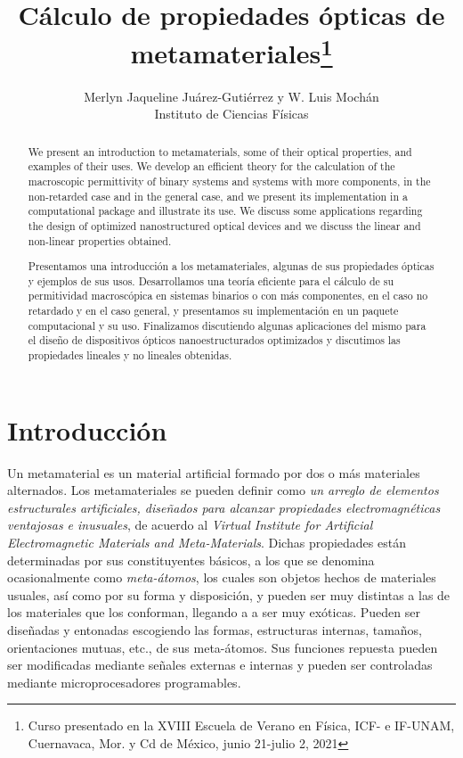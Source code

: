 \documentclass[12pt]{article}
\title{Cálculo de propiedades ópticas de metamateriales\footnote{Curso
    presentado en la XVIII Escuela de Verano en Física, ICF- e
    IF-UNAM, Cuernavaca, Mor. y Cd de México,
  junio 21-julio 2, 2021}}
\author{ Merlyn Jaqueline Juárez-Gutiérrez y W. Luis Mochán\\
  Instituto de Ciencias Físicas}
\begin{document}
\maketitle
{}
\begin{abstract}
  We present an introduction to metamaterials, some of their optical
  properties, and examples of their uses. We develop an efficient
  theory for the calculation of the macroscopic permittivity of binary
  systems and systems with more components, in the non-retarded case and in the
  general case, and we present its implementation in a computational
  package and illustrate its use. We discuss some applications regarding
  the design of optimized nanostructured optical devices and we
  discuss the linear and non-linear properties obtained.
\end{abstract}

\begin{abstract}
  Presentamos una introducción a los metamateriales, algunas de sus
  propiedades ópticas y ejemplos de sus usos. Desarrollamos una teoría
  eficiente para el cálculo de su permitividad macroscópica en
  sistemas binarios o con más componentes, en el caso no retardado y
  en el caso general, y presentamos su implementación en un paquete
  computacional y su uso. Finalizamos discutiendo algunas aplicaciones
  del mismo para el diseño de dispositivos ópticos nanoestructurados
  optimizados y discutimos las propiedades lineales y no lineales
  obtenidas.
\end{abstract}
\section{Introducción}

Un metamaterial es un material artificial formado por
dos o más materiales alternados. Los metamateriales se pueden definir como
{\em un arreglo de elementos estructurales artificiales, diseñados
  para alcanzar propiedades electromagnéticas ventajosas e
  inusuales}\cite{Metamorphose}, de acuerdo al
{\em Virtual Institute for Artificial Electromagnetic Materials and
  Meta-Materials}.
Dichas propiedades están
determinadas por sus constituyentes básicos, a los que se denomina
ocasionalmente como {\em meta-átomos}, los cuales son objetos hechos de
materiales usuales, así como por su forma y disposición, y pueden ser
muy distintas a las de los materiales que los conforman, llegando a
a ser muy exóticas. Pueden ser diseñadas y entonadas escogiendo las formas,
estructuras internas, tamaños, orientaciones mutuas, etc., de sus
meta-átomos.  Sus funciones repuesta pueden ser
modificadas mediante señales externas e internas y pueden ser
controladas mediante microprocesadores
programables.\cite{IntroductiontoMetamaterialsandNanophotonics}
\end{document}

